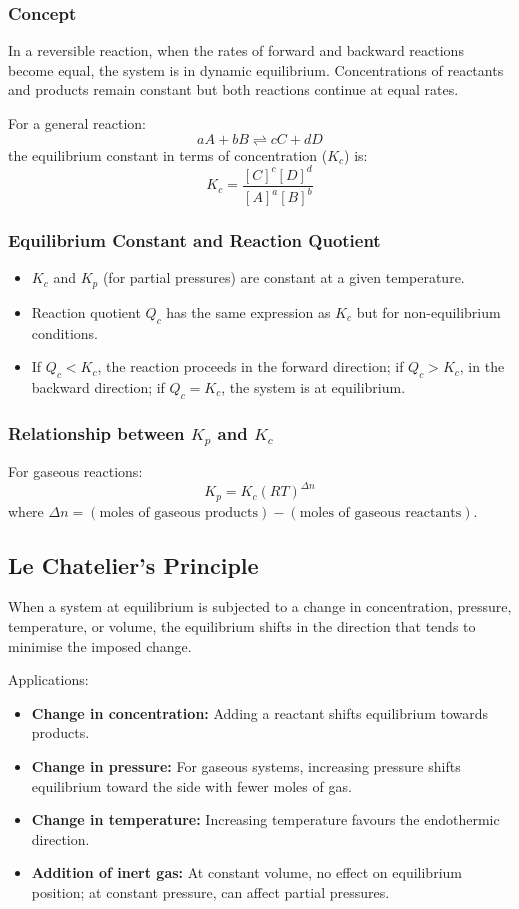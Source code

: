 \documentclass[12pt,a4paper]{article}
\begin{document}
\subsubsection{Concept}
In a reversible reaction, when the rates of forward and backward reactions become equal, the system is in dynamic equilibrium. Concentrations of reactants and products remain constant but both reactions continue at equal rates.

For a general reaction:
\[
aA + bB \rightleftharpoons cC + dD
\]
the equilibrium constant in terms of concentration ($K_c$) is:
\[
K_c = \frac{[C]^c[D]^d}{[A]^a[B]^b}
\]

\subsubsection{Equilibrium Constant and Reaction Quotient}
\begin{itemize}
    \item $K_c$ and $K_p$ (for partial pressures) are constant at a given temperature.
    \item Reaction quotient $Q_c$ has the same expression as $K_c$ but for non-equilibrium conditions.
    \item If $Q_c < K_c$, the reaction proceeds in the forward direction; if $Q_c > K_c$, in the backward direction; if $Q_c = K_c$, the system is at equilibrium.
\end{itemize}

\subsubsection{Relationship between $K_p$ and $K_c$}
For gaseous reactions:
\[
K_p = K_c (RT)^{\Delta n}
\]
where $\Delta n = (\text{moles of gaseous products}) - (\text{moles of gaseous reactants})$.

\subsection{Le Chatelier's Principle}
When a system at equilibrium is subjected to a change in concentration, pressure, temperature, or volume, the equilibrium shifts in the direction that tends to minimise the imposed change.

Applications:
\begin{itemize}
    \item \textbf{Change in concentration:} Adding a reactant shifts equilibrium towards products.
    \item \textbf{Change in pressure:} For gaseous systems, increasing pressure shifts equilibrium toward the side with fewer moles of gas.
    \item \textbf{Change in temperature:} Increasing temperature favours the endothermic direction.
    \item \textbf{Addition of inert gas:} At constant volume, no effect on equilibrium position; at constant pressure, can affect partial pressures.
\end{itemize}
\end{document}
